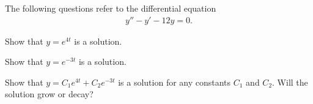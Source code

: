 

\begin{problem}
\item The following questions refer to the  differential
  equation
  \begin{eqnarray*}
    y'' - y' - 12y = 0.
  \end{eqnarray*}

  \begin{subproblem}
  \item Show that $y=e^{4t}$ is a solution.
    \vspace{4cm}
  \item Show that $y=e^{-3t}$ is a solution.
    \vspace{4cm}
  \item Show that $y=C_1 e^{4t} + C_2 e^{-3t}$ is a solution for
    any constants $C_1$ and $C_2$. Will the solution grow or
    decay?

    \vfill

  \end{subproblem}

\end{problem}


